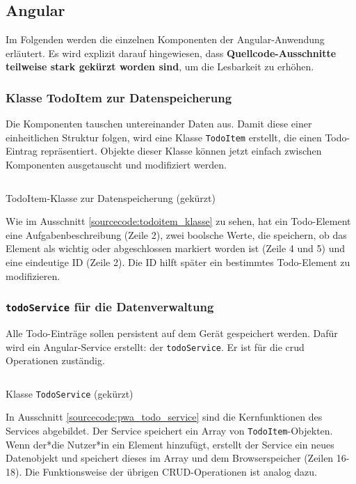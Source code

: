 \subsection{Angular}

Im Folgenden werden die einzelnen Komponenten der Angular-Anwendung erläutert. Es wird explizit darauf hingewiesen, dass \textbf{Quellcode-Ausschnitte teilweise stark gekürzt worden sind}, um die Lesbarkeit zu erhöhen.

\subsubsection{Klasse TodoItem zur Datenspeicherung}

Die Komponenten tauschen untereinander Daten aus. Damit diese einer einheitlichen Struktur folgen, wird eine Klasse \texttt{TodoItem} erstellt, die einen Todo-Eintrag repräsentiert. Objekte dieser Klasse können jetzt einfach zwischen Komponenten ausgetauscht und modifiziert werden.

\begin{listing}[h]
	\inputminted{TypeScript}{sourcecode/pwa_todoitem_klasse.js}
	\caption{TodoItem-Klasse zur Datenspeicherung (gekürzt)}
	\label{sourcecode:todoitem_klasse}
\end{listing}

Wie im Ausschnitt \ref{sourcecode:todoitem_klasse} zu sehen, hat ein Todo-Element eine Aufgabenbeschreibung (Zeile 2), zwei boolsche Werte, die speichern, ob das Element als wichtig oder abgeschlossen markiert worden ist (Zeile 4 und 5) und eine eindeutige ID (Zeile 2). Die ID hilft später ein bestimmtes Todo-Element zu modifizieren.

\subsubsection{\texttt{todoService} für die Datenverwaltung}
Alle Todo-Einträge sollen persistent auf dem Gerät gespeichert werden. Dafür wird ein Angular-Service erstellt: der \texttt{todoService}. Er ist für die \acf{crud} Operationen zuständig.

\begin{listing}[h]
	\inputminted{TypeScript}{sourcecode/pwa_todo_service.ts}
	\caption{Klasse \texttt{TodoService} (gekürzt)}
	\label{sourcecode:pwa_todo_service}
\end{listing}

In Ausschnitt \ref{sourcecode:pwa_todo_service} sind die Kernfunktionen des Services abgebildet. Der Service speichert ein Array von \texttt{TodoItem}-Objekten. Wenn der*die Nutzer*in ein Element hinzufügt, erstellt der Service ein neues Datenobjekt und speichert dieses im Array und dem Browserspeicher (Zeilen 16-18). Die Funktionsweise der übrigen CRUD-Operationen ist analog dazu.

